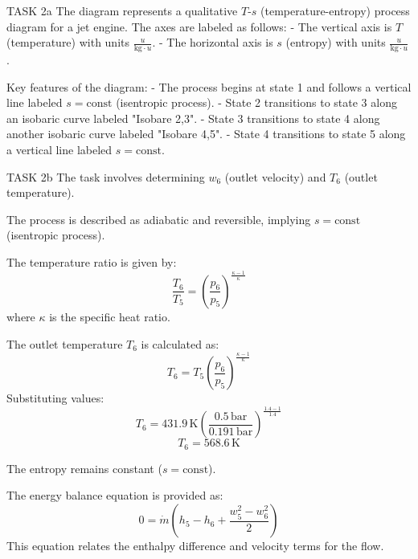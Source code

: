 TASK 2a  
The diagram represents a qualitative \( T \)-\( s \) (temperature-entropy) process diagram for a jet engine. The axes are labeled as follows:  
- The vertical axis is \( T \) (temperature) with units \( \frac{u}{\text{kg} \cdot u} \).  
- The horizontal axis is \( s \) (entropy) with units \( \frac{u}{\text{kg} \cdot u} \).  

Key features of the diagram:  
- The process begins at state 1 and follows a vertical line labeled \( s = \text{const} \) (isentropic process).  
- State 2 transitions to state 3 along an isobaric curve labeled "Isobare 2,3".  
- State 3 transitions to state 4 along another isobaric curve labeled "Isobare 4,5".  
- State 4 transitions to state 5 along a vertical line labeled \( s = \text{const} \).  

TASK 2b  
The task involves determining \( w_6 \) (outlet velocity) and \( T_6 \) (outlet temperature).  

The process is described as adiabatic and reversible, implying \( s = \text{const} \) (isentropic process).  

The temperature ratio is given by:  
\[
\frac{T_6}{T_5} = \left( \frac{p_6}{p_5} \right)^{\frac{\kappa - 1}{\kappa}}
\]  
where \( \kappa \) is the specific heat ratio.  

The outlet temperature \( T_6 \) is calculated as:  
\[
T_6 = T_5 \left( \frac{p_6}{p_5} \right)^{\frac{\kappa - 1}{\kappa}}
\]  
Substituting values:  
\[
T_6 = 431.9 \, \text{K} \left( \frac{0.5 \, \text{bar}}{0.191 \, \text{bar}} \right)^{\frac{1.4 - 1}{1.4}}
\]  
\[
T_6 = 568.6 \, \text{K}
\]  

The entropy remains constant (\( s = \text{const} \)).  

The energy balance equation is provided as:  
\[
0 = \dot{m} \left( h_5 - h_6 + \frac{w_5^2 - w_6^2}{2} \right)
\]  
This equation relates the enthalpy difference and velocity terms for the flow.